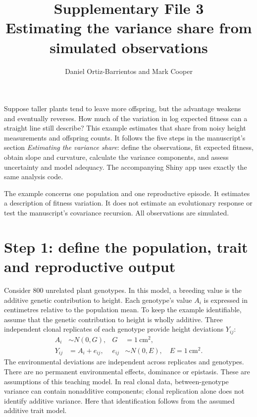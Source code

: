 \documentclass[11pt]{article}
\title{Supplementary File 3\\Estimating the variance share from simulated observations}
\author{Daniel Ortiz-Barrientos and Mark Cooper}
\date{}
\begin{document}
\maketitle

Suppose taller plants tend to leave more offspring, but the advantage weakens and eventually reverses. How much of the variation in log expected fitness can a straight line still describe? This example estimates that share from noisy height measurements and offspring counts. It follows the five steps in the manuscript's section \emph{Estimating the variance share}: define the observations, fit expected fitness, obtain slope and curvature, calculate the variance components, and assess uncertainty and model adequacy. The accompanying Shiny app uses exactly the same analysis code.

The example concerns one population and one reproductive episode. It estimates a description of fitness variation. It does not estimate an evolutionary response or test the manuscript's covariance recursion. All observations are simulated.

\section{Step 1: define the population, trait and reproductive output}

Consider 800 unrelated plant genotypes. In this model, a breeding value is the additive genetic contribution to height. Each genotype's value $A_i$ is expressed in centimetres relative to the population mean. To keep the example identifiable, assume that the genetic contribution to height is wholly additive. Three independent clonal replicates of each genotype provide height deviations $Y_{ij}$:
\begin{align}
 A_i&\sim N(0,G), & G&=1\ \mathrm{cm}^2,\label{eq:A}\\
 Y_{ij}&=A_i+e_{ij}, & e_{ij}&\sim N(0,E),\quad E=1\ \mathrm{cm}^2.\label{eq:measurement}
\end{align}
The environmental deviations are independent across replicates and genotypes. There are no permanent environmental effects, dominance or epistasis. These are assumptions of this teaching model. In real clonal data, between-genotype variance can contain nonadditive components; clonal replication alone does not identify additive variance. Here that identification follows from the assumed additive trait model.
\end{document}
